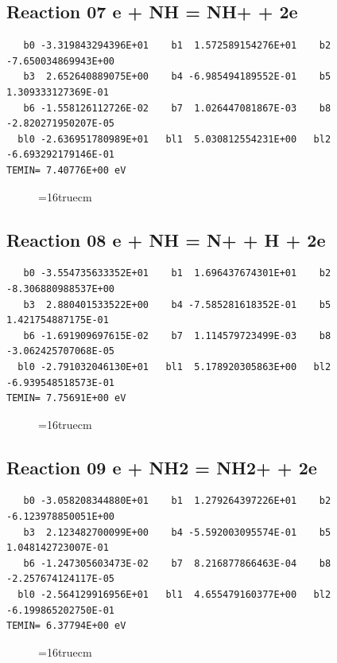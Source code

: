 \documentclass[12pt,dvipdfm]{article}
\begin{document}
\subsection{
Reaction 07 e + NH = NH+ + 2e}
\begin{small}\begin{verbatim}
   b0 -3.319843294396E+01    b1  1.572589154276E+01    b2 -7.650034869943E+00
   b3  2.652640889075E+00    b4 -6.985494189552E-01    b5  1.309333127369E-01
   b6 -1.558126112726E-02    b7  1.026447081867E-03    b8 -2.820271950207E-05
  bl0 -2.636951780989E+01   bl1  5.030812554231E+00   bl2 -6.693292179146E-01
TEMIN= 7.40776E+00 eV
   \end{verbatim}\end{small}
\begin{figure}[h!]
\label{n2rates}
\epsfxsize=16truecm
\end{figure}
\newpage

\subsection{
Reaction 08 e + NH = N+ + H + 2e}
\begin{small}\begin{verbatim}
   b0 -3.554735633352E+01    b1  1.696437674301E+01    b2 -8.306880988537E+00
   b3  2.880401533522E+00    b4 -7.585281618352E-01    b5  1.421754887175E-01
   b6 -1.691909697615E-02    b7  1.114579723499E-03    b8 -3.062425707068E-05
  bl0 -2.791032046130E+01   bl1  5.178920305863E+00   bl2 -6.939548518573E-01
TEMIN= 7.75691E+00 eV
   \end{verbatim}\end{small}
\begin{figure}[h!]
\label{n2rates}
\epsfxsize=16truecm
\end{figure}
\newpage

\subsection{
Reaction 09 e + NH2 = NH2+ + 2e}
\begin{small}\begin{verbatim}
   b0 -3.058208344880E+01    b1  1.279264397226E+01    b2 -6.123978850051E+00
   b3  2.123482700099E+00    b4 -5.592003095574E-01    b5  1.048142723007E-01
   b6 -1.247305603473E-02    b7  8.216877866463E-04    b8 -2.257674124117E-05
  bl0 -2.564129916956E+01   bl1  4.655479160377E+00   bl2 -6.199865202750E-01
TEMIN= 6.37794E+00 eV
   \end{verbatim}\end{small}
\begin{figure}[h!]
\label{n2rates}
\epsfxsize=16truecm
\end{figure}
\newpage
\end{document}
